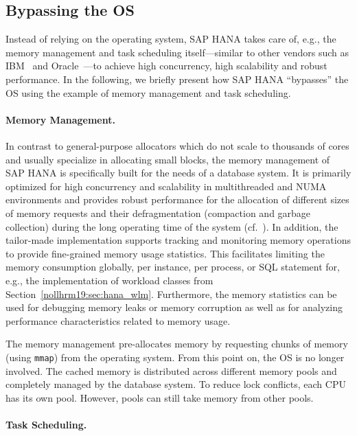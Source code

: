 \documentclass[11pt]{article}
\begin{document}
\subsection{Bypassing the OS}
\label{snollhrm19:sec:bypassing_os}

Instead of relying on the operating system, SAP HANA takes care of, e.g., the memory management and task scheduling itself---similar to other vendors such as IBM~\cite{nollhrm19:IBM:2004:DB2Memory} and Oracle~\cite{nollhrm19:Oracle:2018:Memory}---to achieve high concurrency, high scalability and robust performance.
In the following, we briefly present how SAP HANA ``bypasses'' the OS using the example of memory management and task scheduling.

\paragraph*{Memory Management.}
In contrast to general-purpose allocators which do not scale to thousands of cores and usually specialize in allocating small blocks, the memory management of SAP HANA is specifically built for the needs of a database system.
It is primarily optimized for high concurrency and scalability in multithreaded and NUMA environments and provides robust performance for the  allocation of different sizes of memory requests and their defragmentation (compaction and garbage collection) during the long operating time of the system (cf.~\cite{nollhrm19:Oukid:2017:MMT:3137628.3137629}).
In addition, the tailor-made implementation supports tracking and monitoring memory operations to provide fine-grained memory usage statistics.
This facilitates limiting the memory consumption globally, per instance, per process, or SQL statement for, e.g., the implementation of workload classes from Section~\ref{nollhrm19:sec:hana_wlm}.
Furthermore, the memory statistics can be used for debugging memory leaks or memory corruption as well as for analyzing performance characteristics related to memory usage.

The memory management pre-allocates memory by requesting chunks of memory (using \texttt{mmap}) from the operating system.
From this point on, the OS is no longer involved.
The cached memory is distributed across different memory pools and completely managed by the database system.
To reduce lock conflicts, each CPU has its own pool.
However, pools can still take memory from other pools.


\paragraph*{Task Scheduling.}
\end{document}
